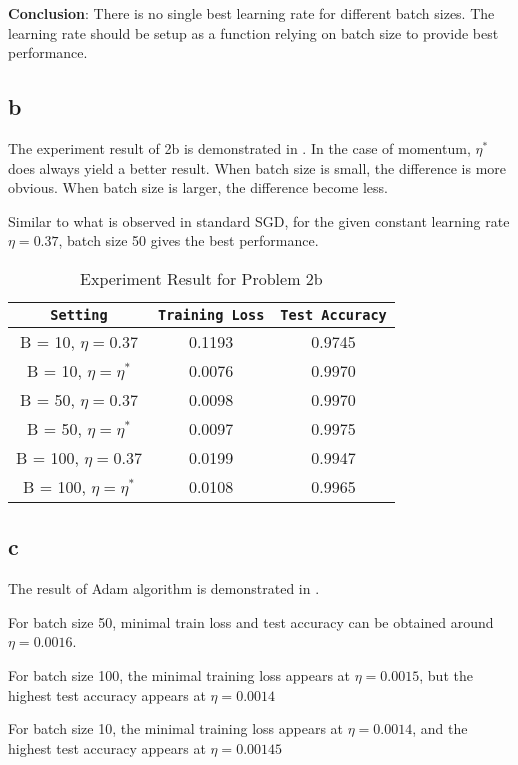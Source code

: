 \documentclass{article}
\begin{document}
\textbf{Conclusion}: There is no single best learning rate for different 
batch sizes. The learning rate should be setup as a function relying on batch
size to provide best performance.

\subsection*{b}
The experiment result of 2b is demonstrated in . In the case of
momentum, $\eta^*$ does always yield a better result. When batch size is small,
the difference is more obvious. When batch size is larger, the difference become
less.

Similar to what is observed in standard SGD, for the given constant learning rate
$\eta= 0.37$, batch size 50 gives the best performance.
\begin{table}
\centering
\begin{tabular}{c|c|c}
\texttt{Setting} & \texttt{Training Loss} & \texttt{Test Accuracy} \\
\hline
B = 10, $\eta = 0.37$ & 0.1193 & 0.9745\\
\hline
B = 10, $\eta = \eta^*$ & 0.0076& 0.9970\\
\hline
B = 50, $\eta = 0.37$ & 0.0098 & 0.9970 \\
\hline
B = 50, $\eta = \eta^*$ & 0.0097& 0.9975\\
\hline
B = 100, $\eta = 0.37$ & 0.0199 & 0.9947 \\
\hline
B = 100, $\eta = \eta^*$ & 0.0108& 0.9965\\
\end{tabular}
\caption{Experiment Result for Problem 2b}
\label{tab:2b}
\end{table}

\subsection*{c}
The result of Adam algorithm is demonstrated in .

For batch size 50, minimal train loss and test accuracy can be 
obtained around $\eta = 0.0016$.

For batch size 100, the minimal training loss appears at $\eta = 0.0015$,
but the highest test accuracy appears at $\eta = 0.0014$

For batch size 10, the minimal training loss appears at $\eta = 0.0014$, 
and the highest test accuracy appears at $\eta = 0.00145$
\end{document}
